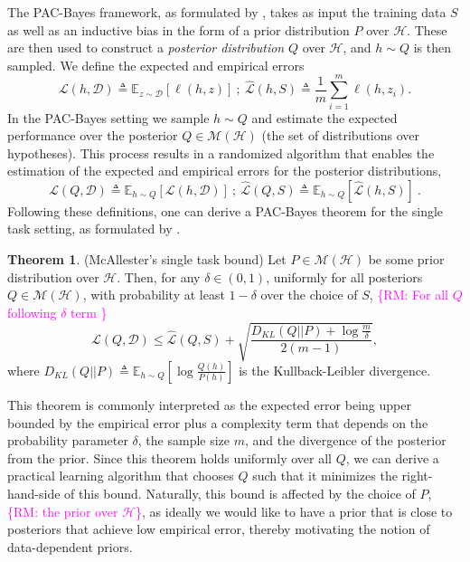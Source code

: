 \documentclass[letterpaper]{article} %
\theoremstyle{definition}
\newtheorem{theorem}{Theorem}[section]
\newcommand{\Expect}[2]{\mathbb{E}_{#1}\left [#2 \right ]}
\newcommand{\RM}[1]{\textcolor{magenta}{\{RM: #1\}}}
\begin{document}
The PAC-Bayes framework, as formulated by \citet{Mcallester}, takes as input the training data $S$ as well as an inductive bias in the form of a prior distribution $P$ over $\mathcal{H}$. These are then used to construct a \emph{posterior distribution} $Q$ over $\mathcal{H}$, and $h\sim Q$ is then sampled. We define the expected and empirical errors
\begin{equation*}
    \mathcal{L}(h, \mathcal{D}) \triangleq \Expect{z\sim \mathcal{D}}{\ell(h,z)} ~;~ \hat{\mathcal{L}}(h, S)\triangleq \frac{1}{m}\sum_{i=1}^{m} \ell(h,z_i) .
\end{equation*}
In the PAC-Bayes setting we sample $h\sim Q$ and estimate the expected performance over the posterior $Q\in \mathcal{M}(\mathcal{H})$ (the set of distributions over hypotheses). This process results in a randomized algorithm that enables the estimation of the expected and empirical errors for the posterior distributions, 
\begin{equation*}
    \mathcal{L}(Q, \mathcal{D}) \triangleq \Expect{h\sim Q}{\mathcal{L}(h, \mathcal{D})} ~;~ 
    \hat{\mathcal{L}}(Q, S) \triangleq \Expect{h\sim Q}{\hat{\mathcal{L}}(h, S)}~.
\end{equation*}
Following these definitions, one can derive a PAC-Bayes theorem for the single task setting, as formulated by \citet{Mcallester}. 
%
\begin{theorem} (McAllester's single task bound) \label{thm:classic-pb}
	Let $P\in \mathcal{M}(\mathcal{H})$ be some prior distribution over $\mathcal{H}$. Then, 
	for any $\delta \in (0,1)$, uniformly for all posteriors $Q\in \mathcal{M}(\mathcal{H})$, with probability at least $1-\delta$ over the choice of $S$, \RM{For all $Q$ following $\delta$ term }
	$$\mathcal{L}(Q, \mathcal{D}) \leq \hat{\mathcal{L}}(Q, S)+\sqrt{\frac{D_{KL}(Q||P)+\log\frac{m}{\delta}}{2(m-1)}}, 
	$$
	where $D_{KL}(Q||P)\triangleq \Expect{h\sim Q}{\log\frac{Q(h)}{P(h)}}$ is the Kullback-Leibler divergence.
\end{theorem}
%
This theorem is commonly interpreted as the expected error being upper bounded by the empirical error plus a complexity term that depends on the probability parameter $\delta$, the sample size $m$, and the divergence of the posterior from the prior. Since this theorem holds uniformly over all $Q$, we can derive a practical learning algorithm that chooses $Q$ such that it minimizes the right-hand-side of this bound. Naturally, this bound is affected by the choice of $P$, \RM{the prior over $\mathcal{H}$}, as ideally we would like to have a prior that is close to posteriors that achieve low empirical error, thereby motivating the notion of data-dependent priors.
\end{document}
